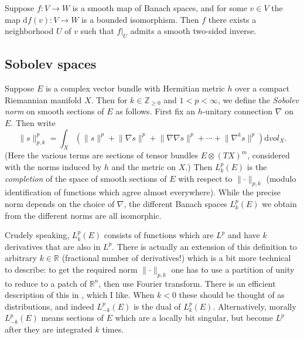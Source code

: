 \documentclass[12pt,letterpaper,reqno]{article}
\numberwithin{equation}{section}
\newcommand{\R}{\ensuremath{\mathbb R}}
\newcommand{\Z}{\ensuremath{\mathbb Z}}
\newcommand{\de}{\mathrm{d}}
\newcommand{\norm}[1]{\lVert#1\rVert}
\newcommand{\ti}[1]{\textit{#1}}
\begin{document}
\begin{thm}
Suppose $f: V \to W$ is a smooth map of Banach spaces, and for some
$v \in V$ the map $\de f(v): V \to W$ is a bounded isomorphism.
Then $f$ there exists a neighborhood $U$ of $v$ such that $f \vert_U$
admits a smooth two-sided inverse.
\end{thm}

\subsection{Sobolev spaces}

\begin{example} Suppose $E$ is a complex
vector bundle with Hermitian metric $h$
over a compact Riemannian manifold $X$. Then for $k \in \Z_{\ge 0}$ and
$1 < p < \infty$, we define the \ti{Sobolev norm}
on smooth sections of $E$ as follows.
First fix an $h$-unitary connection $\nabla$ on $E$.
Then write
\begin{equation}
  \norm{s}^p_{p,k} = \int_X \left(\norm{s}^p + \norm{\nabla s}^p + \norm {\nabla \nabla s}^p +
    \cdots + \norm{\nabla^k s}^p\right) \de vol_X.
\end{equation}
(Here the various terms are sections of tensor bundles $E \otimes (TX)^m$,
considered with the norms induced by $h$ and the metric on $X$.)
Then $L^p_k(E)$ is the \ti{completion} of the space of smooth
sections of $E$ with respect to $\norm{\cdot}_{p,k}$ (modulo identification
of functions which agree almost everywhere).
While the precise norm depends on the choice of $\nabla$, the
different Banach spaces $L^p_k(E)$ we obtain from the different
norms are all isomorphic.
\end{example}

Crudely speaking, $L^p_k(E)$ consists of functions which are $L^p$ and
have $k$ derivatives that are also in $L^p$.
There is actually an extension of this definition to arbitrary $k \in \R$
(fractional number of derivatives!) which is a bit more technical to describe:
to get the required norm $\norm{\cdot}_{p,k}$
one has to use a partition of unity to reduce to a patch of $\R^n$,
then use Fourier transform. There is an efficient description of this in
\cite{MR2359489}, which I like. When $k<0$ these should be thought of
as distributions, and indeed $L^p_{-k}(E)$ is the dual of
$L^p_k(E)$.
Alternatively, morally $L^p_{-k}(E)$ means sections of $E$
which are a locally bit singular, but become $L^p$ after they
are integrated $k$ times.
\end{document}
